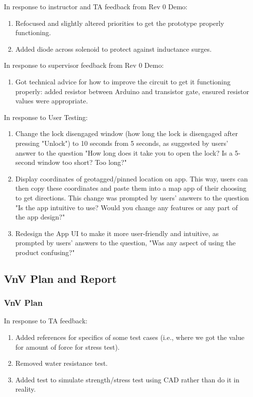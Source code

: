 \documentclass{article}
\begin{document}
\noindent In response to instructor and TA feedback from Rev 0 Demo:
\begin{enumerate}
    \item Refocused and slightly altered priorities to get the prototype properly functioning.
    \item Added diode across solenoid to protect against inductance surges.
\end{enumerate}

\noindent In response to supervisor feedback from Rev 0 Demo:
\begin{enumerate}
    \item Got technical advice for how to improve the circuit to get it functioning properly: added resistor between Arduino and transistor gate, ensured resistor values were appropriate.
\end{enumerate}

\noindent In response to User Testing:
\begin{enumerate}
    \item Change the lock disengaged window (how long the lock is disengaged after pressing "Unlock") to 10 seconds from 5 seconds, as suggested by users' answer to the question "How long does it take you to open the lock? Is a 5-second window too short? Too long?"
    \item Display coordinates of geotagged/pinned location on app. This way, users can then copy these coordinates and paste them into a map app of their choosing to get directions. This change was prompted by users' answers to the question "Is the app intuitive to use? Would you change any features or any part of the app design?"
    \item Redesign the App UI to make it more user-friendly and intuitive, as prompted by users' answers to the question, "Was any aspect of using the product confusing?"
 
\end{enumerate}

\subsection{VnV Plan and Report}

\subsubsection{VnV Plan}
In response to TA feedback:
\begin{enumerate}
    \item Added references for specifics of some test cases (i.e., where we got the value for amount of force for stress test).
    \item Removed water resistance test.
    \item Added test to simulate strength/stress test using CAD rather than do it in reality.
\end{enumerate}
\end{document}
